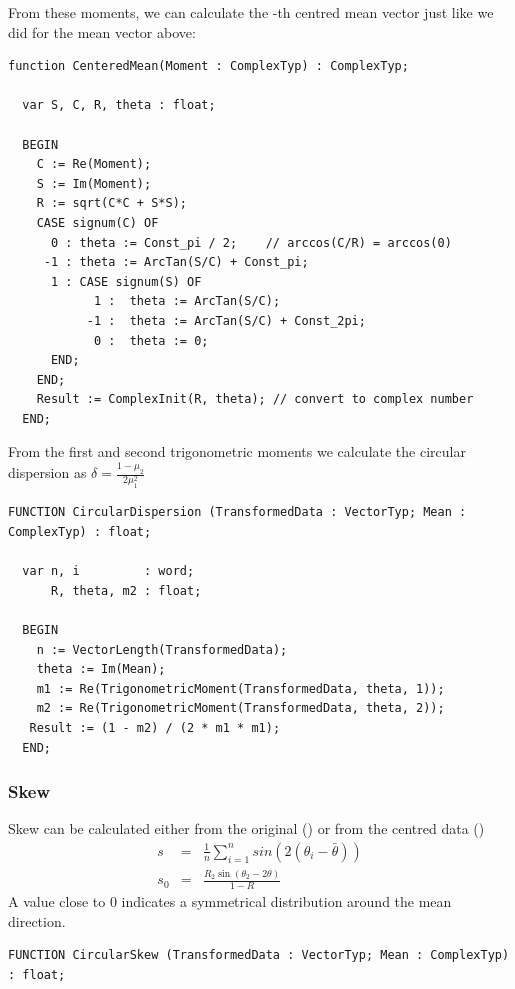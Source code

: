 \begin{refsection}
From these moments, we can calculate the -th centred mean vector just like we did for the mean vector above:
\begin{lstlisting}[caption=p-th centered mean]
  function CenteredMean(Moment : ComplexTyp) : ComplexTyp;

  var S, C, R, theta : float;

  BEGIN
    C := Re(Moment);
    S := Im(Moment);
    R := sqrt(C*C + S*S);
    CASE signum(C) OF
      0 : theta := Const_pi / 2;    // arccos(C/R) = arccos(0)
     -1 : theta := ArcTan(S/C) + Const_pi;
      1 : CASE signum(S) OF
            1 :  theta := ArcTan(S/C);
           -1 :  theta := ArcTan(S/C) + Const_2pi;
            0 :  theta := 0;
      END;
    END;
    Result := ComplexInit(R, theta); // convert to complex number
  END;
\end{lstlisting}

From the first and second trigonometric moments  we calculate the circular dispersion as \( \delta = \frac{1 - \mu_2}{2 \mu_1^2} \)

\begin{lstlisting}[caption=Circular dispersion]
  FUNCTION CircularDispersion (TransformedData : VectorTyp; Mean : ComplexTyp) : float;

  var n, i         : word;
      R, theta, m2 : float;

  BEGIN
    n := VectorLength(TransformedData);
    theta := Im(Mean);
    m1 := Re(TrigonometricMoment(TransformedData, theta, 1));
    m2 := Re(TrigonometricMoment(TransformedData, theta, 2));
   Result := (1 - m2) / (2 * m1 * m1);
  END;
\end{lstlisting}

\subsubsection{Skew}

Skew can be calculated either from the original () or from the centred data ()
\begin{eqnarray}
  s   &=& \frac{1}{n} \sum_{i=1}^n sin(2 (\theta_i - \bar{\theta})) \\
  s_0 &=& \frac{R_2 \sin(\theta_2 - 2 \theta)}{1 - R}
\end{eqnarray}
A value close to \num{0} indicates a symmetrical distribution around the mean direction.

\begin{lstlisting}[caption=Circular skew]
  FUNCTION CircularSkew (TransformedData : VectorTyp; Mean : ComplexTyp) : float;


\end{lstlisting}
\end{refsection}
